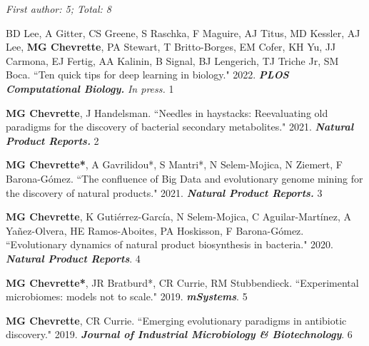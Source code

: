 
 \vspace{-2mm}

\begin{cvpubs}

\cvpub
{\hspace{-1cm} \textit{First author: 5; Total: 8}}
{}

\cvpub
{BD Lee, A Gitter, CS Greene, S Raschka, F Maguire, AJ Titus, MD Kessler, AJ Lee, \textbf{MG Chevrette}, PA Stewart, T Britto-Borges, EM Cofer, KH Yu, JJ Carmona, EJ Fertig, AA Kalinin, B Signal, BJ Lengerich, TJ Triche Jr, SM Boca. ``Ten quick tips for deep learning in biology." 2022. \textbf{\textit{PLOS Computational Biology.}} \textit{In press.} \textit{\textbf{}}}
{1}

\cvpub
{\textbf{MG Chevrette}, J Handelsman. ``Needles in haystacks: Reevaluating old paradigms for the discovery of bacterial secondary metabolites." 2021. \textit{\textbf{Natural Product Reports.}} \textbf{\textit{}}}
{2}

\cvpub
{\textbf{MG Chevrette*}, A Gavrilidou*, S Mantri*, N Selem-Mojica, N Ziemert, F Barona-G\'{o}mez. ``The confluence of Big Data and evolutionary genome mining for the discovery of natural products." 2021. \textit{\textbf{Natural Product Reports.}} \textbf{\textit{}}}
{3}

\cvpub
{\textbf{MG Chevrette}, K Guti\'{e}rrez-Garc\'{i}a, N Selem-Mojica, C Aguilar-Mart\'{i}nez, A Ya\~{n}ez-Olvera, HE Ramos-Aboites, PA Hoskisson, F Barona-G\'{o}mez. ``Evolutionary dynamics of natural product biosynthesis in bacteria." 2020. \textit{\textbf{Natural Product Reports}}. \textbf{\textit{}}}
{4}

\end{cvpubs} \begin{cvpubs}

\cvpub
{\textbf{MG Chevrette*}, JR Bratburd*, CR Currie, RM Stubbendieck. ``Experimental microbiomes: models not to scale." 2019. \textit{\textbf{mSystems}}. \textbf{\textit{}}}
{5}

\cvpub
{\textbf{MG Chevrette}, CR Currie. ``Emerging evolutionary paradigms in antibiotic discovery." 2019. \textit{\textbf{Journal of Industrial Microbiology \& Biotechnology}}. \textbf{\textit{}}}
{6}


\end{cvpubs}
